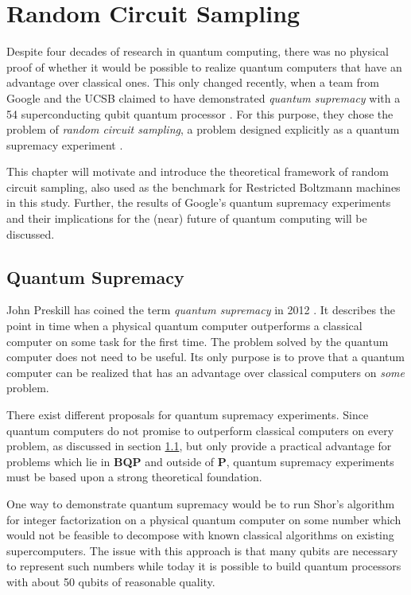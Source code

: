 \chapter{Random Circuit Sampling}

Despite four decades
of research in quantum computing, 
there was no physical proof of whether it would be possible to realize quantum computers
that have an advantage over classical ones. This only changed
recently, when a team from Google and the UCSB claimed to have demonstrated \textit{quantum supremacy}
with a 54 superconducting qubit quantum processor \cite{martines2019supremacy}. For this purpose, they
chose the problem of \textit{random circuit sampling}, a problem designed explicitly
as a quantum supremacy experiment \cite{Boixo2018supremacy}.

This chapter will motivate and introduce the theoretical framework of random circuit
sampling, also used as the benchmark for Restricted Boltzmann machines in this
study. Further, the results of Google's quantum supremacy experiments and their
implications for the (near) future of quantum computing will be discussed.

\section{Quantum Supremacy}

John Preskill has coined the term \textit{quantum supremacy} in 2012
\cite{preskill2012quantum}. It describes the point in time when a physical quantum computer
outperforms a classical computer on some task for the first time. The problem
solved by the quantum computer does not need to be useful. Its only purpose is
to prove that a quantum computer can be realized that has an advantage over
classical computers on \textit{some} problem.

There exist different proposals for quantum supremacy
experiments. Since quantum computers do not promise to outperform classical
computers on every problem, as discussed in section \ref{}, but only provide a
practical advantage for problems which lie in \textbf{BQP} and outside of
\textbf{P}, quantum supremacy experiments must be based upon a strong theoretical foundation.

One way to demonstrate quantum supremacy would be to run Shor's
algorithm for integer factorization \cite{shor1997factorisation} on a physical quantum computer on some number which would not be feasible
to decompose with known classical algorithms on existing supercomputers. The issue with this approach is that many
qubits are necessary to represent such numbers while today it is possible to
build quantum processors with about 50 qubits of reasonable quality.

